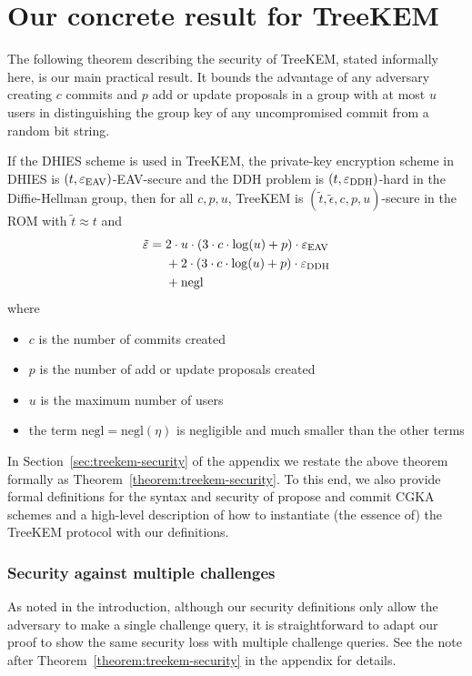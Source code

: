\section{Our concrete result for TreeKEM}

The following theorem describing the security of TreeKEM, stated informally here, is our main practical result. It bounds the advantage of any adversary creating $c$ commits and $p$ add or update proposals in a group with at most $u$ users in distinguishing the group key of any uncompromised commit from a random bit string.

\begin{theorem}[Informal] \label{theorem:treekem-security-informal}
	If the DHIES scheme is used in TreeKEM, the private-key encryption scheme in DHIES is $(t, \varepsilon_\mathrm{EAV})$-EAV-secure and the DDH problem is $(t, \varepsilon_\mathrm{DDH})$-hard in the Diffie-Hellman group, then for all $c, p, u$, TreeKEM is $(\tilde{t}, \tilde{\epsilon}, c, p, u)$-secure in the ROM with $\tilde{t} \approx t$ and
	\begin{align*}
		\begin{split}
			\tilde{\varepsilon} ={} & 2 \cdot u \cdot (3 \cdot c \cdot \log(u) + p) \cdot \varepsilon_\mathrm{EAV} \\
			& + 2 \cdot (3 \cdot c \cdot \log(u) + p) \cdot \varepsilon_\mathrm{DDH} \\
			& + \mathrm{negl}
		\end{split}
	\end{align*}
	where
	\begin{itemize}
		\item $c$ is the number of commits created
		\item $p$ is the number of add or update proposals created
		\item $u$ is the maximum number of users
		\item the term $\mathrm{negl} = \mathrm{negl}(\eta)$ is negligible and much smaller than the other terms
	\end{itemize}
\end{theorem}

In Section~\ref{sec:treekem-security} of the appendix we restate the above theorem formally as Theorem~\ref{theorem:treekem-security}. To this end, we also provide formal definitions for the syntax and security of propose and commit CGKA schemes and a high-level description of how to instantiate (the essence of) the TreeKEM protocol with our definitions.

\subsubsection{Security against multiple challenges} As noted in the introduction, although our security definitions only allow the adversary to make a single challenge query, it is straightforward to adapt our proof to show the same security loss with multiple challenge queries. See the note after Theorem~\ref{theorem:treekem-security} in the appendix for details.

